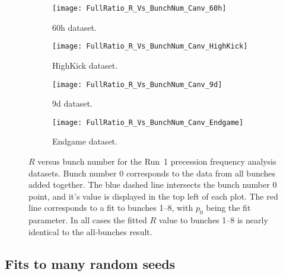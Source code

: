 

\begin{figure}
\centering
    \begin{subfigure}[]{0.41\textwidth}
        \centering
        \texttt{[image: FullRatio\_R\_Vs\_BunchNum\_Canv\_60h]}
        \caption{60h dataset.}
    \end{subfigure}%
    \begin{subfigure}[]{0.41\textwidth}
        \centering
        \texttt{[image: FullRatio\_R\_Vs\_BunchNum\_Canv\_HighKick]}
        \caption{HighKick dataset.}
    \end{subfigure}

    \begin{subfigure}[]{0.41\textwidth}
        \centering
        \texttt{[image: FullRatio\_R\_Vs\_BunchNum\_Canv\_9d]}
        \caption{9d dataset.}
    \end{subfigure}%
    \begin{subfigure}[]{0.41\textwidth}
        \centering
        \texttt{[image: FullRatio\_R\_Vs\_BunchNum\_Canv\_Endgame]}
        \caption{Endgame dataset.}
    \end{subfigure}
\caption[$R$ versus bunch number]{$R$ versus bunch number for the Run~1 precession frequency analysis datasets. Bunch number 0 corresponds to the data from all bunches added together. The blue dashed line intersects the bunch number 0 point, and it's value is displayed in the top left of each plot. The red line corresponds to a fit to bunches 1--8, with $p_{0}$ being the fit parameter. In all cases the fitted $R$ value to bunches 1--8 is nearly identical to the all-bunches result.}
\label{fig:bunchNum_R}
\end{figure}


\clearpage


\subsection{Fits to many random seeds}
\label{sub:randomSeedFits}


